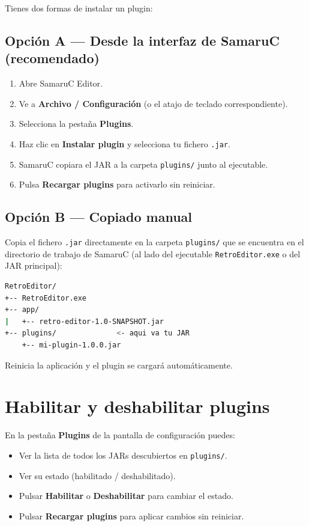 \documentclass[../../main.tex]{subfiles}
\begin{document}
Tienes dos formas de instalar un plugin:

\subsection{Opción A — Desde la interfaz de SamaruC (recomendado)}

\begin{enumerate}
\item Abre SamaruC Editor.
\item Ve a \textbf{Archivo / Configuración} (o el atajo de teclado correspondiente).
\item Selecciona la pesta\~na \textbf{Plugins}.
\item Haz clic en \textbf{Instalar plugin} y selecciona tu fichero \texttt{.jar}.
\item SamaruC copiara el JAR a la carpeta \texttt{plugins/} junto al ejecutable.
\item Pulsa \textbf{Recargar plugins} para activarlo sin reiniciar.
\end{enumerate}

\clearpage

\subsection{Opción B — Copiado manual}

Copia el fichero \texttt{.jar} directamente en la carpeta \texttt{plugins/} que se encuentra en el directorio de trabajo de SamaruC (al lado del ejecutable \texttt{RetroEditor.exe} o del JAR principal):

\begin{lstlisting}[language=bash]
RetroEditor/
+-- RetroEditor.exe
+-- app/
|   +-- retro-editor-1.0-SNAPSHOT.jar
+-- plugins/              <- aqui va tu JAR
    +-- mi-plugin-1.0.0.jar
\end{lstlisting}

Reinicia la aplicación y el plugin se cargará automáticamente.

\section{Habilitar y deshabilitar plugins}

En la pestaña \textbf{Plugins} de la pantalla de configuración puedes:

\begin{itemize}
    \item Ver la lista de todos los JARs descubiertos en \texttt{plugins/}.
    \item Ver su estado (habilitado / deshabilitado).
    \item Pulsar \textbf{Habilitar} o \textbf{Deshabilitar} para cambiar el estado.
    \item Pulsar \textbf{Recargar plugins} para aplicar cambios sin reiniciar.
\end{itemize}
\end{document}
